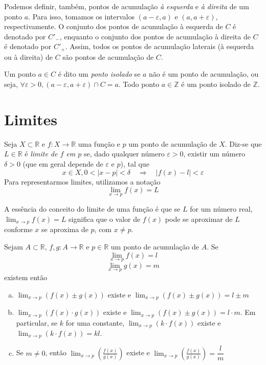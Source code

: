Podemos definir, também, pontos de acumulação \emph{à esquerda} e \emph{à direita} de um ponto $a$. Para isso, tomamos os intervalos $(a-\varepsilon,a)$ e $(a, a+\varepsilon)$, respectivamente. O conjunto dos pontos de acumulação à esquerda de $C$ é denotado por $C'_-$, enquanto o conjunto dos pontos de acumulação à direita de $C$ é denotado por $C'_+$. Assim, todos os pontos de acumulação laterais (à esquerda ou à direita) de $C$ são pontos de acumulação de $C$. \par 
Um ponto $a \in C$ é dito um \emph{ponto isolado} se $a$ não é um ponto de acumulação, ou seja, $\forall \varepsilon>0, (a-\varepsilon,a+\varepsilon)\cap C={a}$. Todo ponto $a \in \mathbb{Z}$ é um ponto isolado de $\mathbb{Z}$.

\section{Limites}

\begin{df}
Seja $X \subset \mathbb{R}$ e $f:X\rightarrow \mathbb{R}$ uma função e $p$ um ponto de acumulação de $X$. Diz-se que $L\in \mathbb{R}$ é \emph{limite de $f$ em $p$} se, dado qualquer número $\varepsilon>0$, existir um número $\delta >0$ (que em geral depende de $\varepsilon$ e $p$), tal que \[x\in X, 0<|x-p|<\delta \quad \Rightarrow \quad |f(x)-l|<\varepsilon\]
Para representarmos limites, utilizamos a notação\[ \lim_{x\rightarrow p}f(x)=L\]
\end{df}
A essência do conceito do limite de uma função é que se $L$ for um número real, $\lim_{x\rightarrow p}f(x)=L$ significa que o valor de $f(x)$ pode se aproximar de $L$ conforme $x$ se aproxima de $p$, com $x\neq p$.
\begin{teo}
Sejam $A \subset \mathbb{R}$, $f,g:A \rightarrow \mathbb{R}$ e $p \in \mathbb{R}$ um ponto de acumulação de $A$. Se \[\lim_{x\rightarrow p}f(x)=l\] \[\lim_{x\rightarrow p}g(x)=m\] existem então
\begin{enumerate}[(a)]
\item $\lim_{x\rightarrow p}\left( f(x) \pm g(x)\right)$ existe e $\lim_{x\rightarrow p}\left( f(x) \pm g(x)\right)=l\pm m$
\item $\lim_{x\rightarrow p}\left( f(x) \cdot  g(x)\right)$ existe e $\lim_{x\rightarrow p}\left( f(x) \pm g(x)\right)=l\cdot m$. Em particular, se $k$ for uma constante, $\lim_{x\rightarrow p}\left( k\cdot f(x) \right)$ existe e $\lim_{x\rightarrow p}\left(k\cdot f(x) \right)=kl$.
\item Se $m\neq 0$, então $\lim_{x\rightarrow p}\left( \frac{f(x)}{g(x)}\right)$ existe e $\lim_{x\rightarrow p}\left(\frac{f(x)}{g(x)}\right)=\dfrac{l}{m}$
\end{enumerate}
\end{teo}

